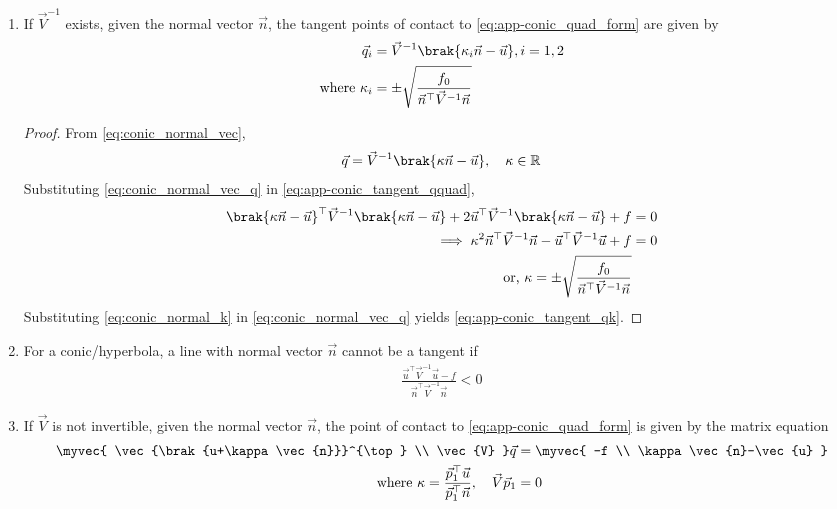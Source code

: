 \begin{enumerate}[label=\thesubsection.\arabic*.,ref=\thesubsection.\theenumi]
\begin{proof}
		\end{proof}
\item
  If $\vec{V}^{-1}$ exists, given the normal vector $\vec{n}$, the tangent points of contact to \eqref{eq:app-conic_quad_form} are given by
\begin{align}
  \begin{split}
\vec{q}_i &= \vec{V}^{-1}\brak{\kappa_i \vec{n}-\vec{u}}, i = 1,2
\\
\text{where }\kappa_i &= \pm \sqrt{
\frac{
f_0
}
{
\vec{n}^{\top}\vec{V}^{-1}\vec{n}
}
}
  \end{split}
\label{eq:app-conic_tangent_qk}
\end{align}
\begin{proof}
  From \eqref{eq:conic_normal_vec},
\begin{align}
\label{eq:conic_normal_vec_q}
 \vec{q} = \vec{V}^{-1}\brak{\kappa \vec{n}-\vec{u}}, \quad \kappa \in \mathbb{R}
\end{align}
Substituting \eqref{eq:conic_normal_vec_q}
in \eqref{eq:app-conic_tangent_qquad},
\begin{align}
\brak{\kappa \vec{n}-\vec{u}}^{\top}\vec{V}^{-1}\brak{\kappa \vec{n}-\vec{u}} 
+ 2\vec{u}^{\top}\vec{V}^{-1}\brak{\kappa \vec{n}-\vec{u}} +f &= 0
\\
\implies 
\kappa^2 \vec{n}^{\top}\vec{V}^{-1}\vec{n} - \vec{u}^{\top}\vec{V}^{-1}\vec{u} + f &=0
 \\
 \text{or, } \kappa = \pm \sqrt{\frac{
	f_0 
 }{\vec{n}^{\top}\vec{V}^{-1}\vec{n}}} &
	\label{eq:conic_normal_k}
\end{align}
%
Substituting \eqref{eq:conic_normal_k} in \eqref{eq:conic_normal_vec_q}
yields \eqref{eq:app-conic_tangent_qk}.
%
\end{proof}
\item For a conic/hyperbola, a line with normal vector $\vec{n}$ cannot be a tangent if 
\begin{align}
\frac{
\vec{u}^{\top}\vec{V}^{-1}\vec{u}-f
}
{
\vec{n}^{\top}\vec{V}^{-1}\vec{n}
} < 0
\end{align}

\item
	\label{eq:conic-p-contact-parab}
  If $\vec{V}$ is not invertible,  given the normal vector $\vec{n}$, the point of contact to \eqref{eq:app-conic_quad_form} is given by the matrix equation
\begin{align}
\label{eq:app-conic_tangent_q_eigen}
\myvec{
\vec{\brak{u+\kappa \vec{n}}}^{\top} \\ \vec{V}
}
\vec{q} &= 
\myvec{
-f
\\
\kappa\vec{n}-\vec{u}
}
\\
\text{where }  \kappa = \frac{\vec{p}_1^{\top}\vec{u}}{\vec{p}_1^{\top}\vec{n}}, \quad \vec{V}\vec{p}_1 &= 0
\label{eq:app-conic_tangent_qk_eigen}
\end{align}



\end{enumerate}
